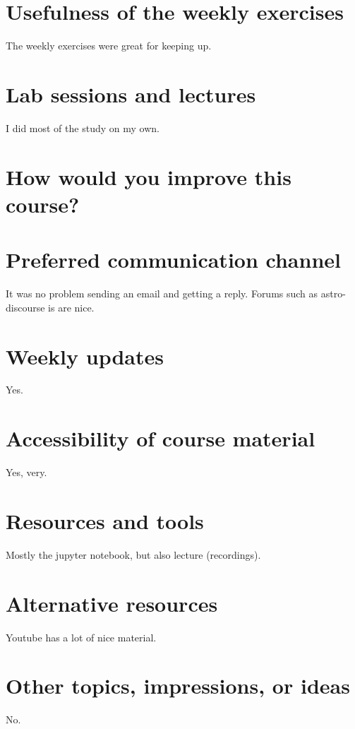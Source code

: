 \documentclass[12pt]{article}
\begin{document}
\vspace{2cm}

\section*{Usefulness of the weekly exercises}
\noindent
The weekly exercises were great for keeping up. 
\vspace{2cm}

\section*{Lab sessions and lectures}
\noindent
I did most of the study on my own. 

\vspace{2cm}

\section*{How would you improve this course?}
\noindent


\vspace{2cm}

\section*{Preferred communication channel}
\noindent
It was no problem sending an email and getting a reply. Forums such as astro-discourse is are nice. 
\vspace{2cm}

\section*{Weekly updates}
\noindent
Yes. 

\vspace{2cm}

\section*{Accessibility of course material}
\noindent
Yes, very.

\vspace{2cm}

\section*{Resources and tools}
\noindent
Mostly the jupyter notebook, but also lecture (recordings).

\vspace{2cm}

\section*{Alternative resources}
\noindent
Youtube has a lot of nice material.

\vspace{2cm}

\section*{Other topics, impressions, or ideas}
\noindent
No.

\vspace{2cm}
\end{document}
